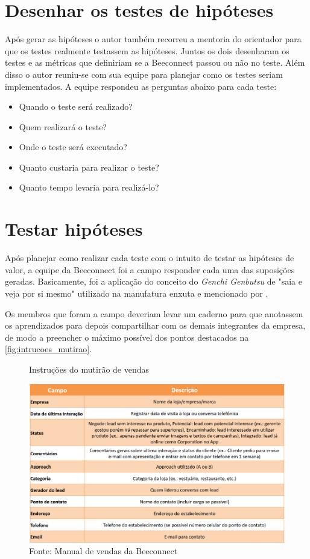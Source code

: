 \section{Desenhar os testes de hipóteses}
\label{cha:desenhar_hipoteses}
Após gerar as hipóteses o autor também recorreu a mentoria do orientador para que os testes realmente testassem as hipóteses. Juntos os dois desenharam os testes e as métricas que definiriam se a Beeconnect passou ou não no teste. 
Além disso o autor reuniu-se com sua equipe para planejar como os testes seriam implementados. A equipe respondeu as perguntas abaixo para cada teste:
\begin{itemize}
\item Quando o teste será realizado?
\item Quem realizará o teste?
\item Onde o teste será executado?
\item Quanto custaria para realizar o teste?
\item Quanto tempo levaria para realizá-lo?
\end{itemize}

\section{Testar hipóteses}
\label{cha:testar_hipoteses}
Após planejar como realizar cada teste com o intuito de testar as hipóteses de valor, a equipe da Beeconnect foi a campo responder cada uma das suposições geradas. Basicamente, foi a aplicação do conceito do \textit{Genchi Genbutsu} de "saia e veja por si mesmo" utilizado na manufatura enxuta e mencionado por .

Os membros que foram a campo deveriam levar um caderno para que anotassem os aprendizados para depois compartilhar com os demais integrantes da empresa, de modo a preencher o máximo possível dos pontos destacados na \autoref{fig:intrucoes_mutirao}. 

\begin{figure}[H]
\caption{Instruções do mutirão de vendas}
\centerline{\includegraphics[width=1.0\textwidth]{img/intrucoes_mutirao}}
\label{fig:intrucoes_mutirao}
\caption* {Fonte: Manual de vendas da Beeconnect}
\end{figure}

